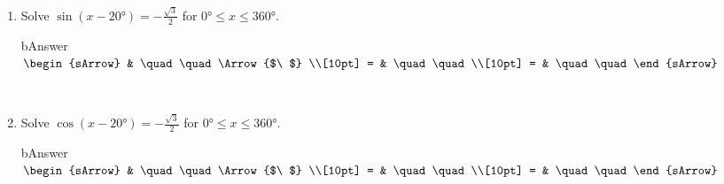 \clearpage\noindent%
\begin{enumerate}[resume]
  \item Solve $\sin{(x-20\si{\degree})}=-\frac{\sqrt{3}}{2}$ for $  0\si{\degree} \leqslant x \leqslant 360\si{\degree}$.
      \begin{envOut}[equal height group=A-Rev-1]{bAnswer}
	       $\begin{sArrow}
	             & \quad\quad       \Arrow{$\ $} \\[10pt]
               = & \quad\quad               \\[10pt]      
			   = & \quad\quad  
	        \end{sArrow}$
      \end{envOut}
	  \begin{shortsolution}  
	     $ \quad \quad \quad \quad$
 	  \end{shortsolution}
	  
  \item Solve $\cos{(x-20\si{\degree})}=-\frac{\sqrt{3}}{2}$ for $  0\si{\degree} \leqslant x \leqslant 360\si{\degree}$.
      \begin{envOut}[equal height group=A-Rev-1]{bAnswer}
	       $\begin{sArrow}
	             & \quad\quad       \Arrow{$\ $} \\[10pt]
               = & \quad\quad               \\[10pt]      
			   = & \quad\quad  
	        \end{sArrow}$
      \end{envOut}
	  \begin{shortsolution}  
	     $ \quad \quad \quad \quad$
 	  \end{shortsolution}
\end{enumerate}

